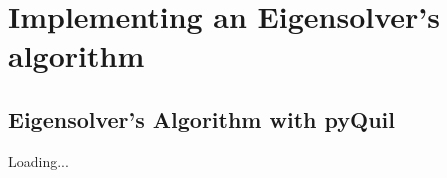 
\newpage


\section{Implementing an Eigensolver's algorithm}


\subsection{Eigensolver's Algorithm with pyQuil}

Loading...

\newpage
